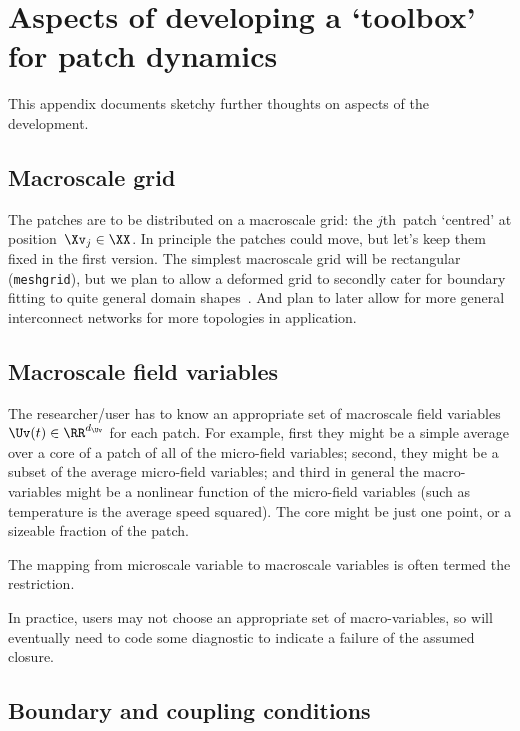 \chapter{Aspects of developing a `toolbox' for patch dynamics}
\secttoc

This appendix documents sketchy further thoughts on aspects of the development.


\section{Macroscale grid}

The patches are to be distributed on a macroscale grid: the \(j\)th~patch `centred' at position~\(\Xv_j\in\XX\).
In principle the patches could move, but let's keep them fixed in the first version.
The simplest macroscale grid will be rectangular (\texttt{meshgrid}), but we plan to allow a deformed grid to secondly cater for boundary fitting to quite general domain shapes~\XX.
And plan to later allow for more general interconnect networks for more topologies in application.




\section{Macroscale field variables}

The researcher\slash user has to know an appropriate set of macroscale field variables~\(\Uv(t)\in\RR^{d_{\Uv}}\) for each patch.  
For example, first they might be a simple average over a core of a patch of all of the micro-field variables; second, they might be a subset of the average micro-field variables; and third in general the macro-variables might be a nonlinear function of the micro-field variables (such as temperature is the average speed squared).
The core might be just one point, or a sizeable fraction of the patch.

The mapping from microscale variable to macroscale variables is often termed the restriction.

In practice, users may not choose an appropriate set of macro-variables, so will eventually need to code some diagnostic to indicate a failure of the assumed closure.




\section{Boundary and coupling conditions}

